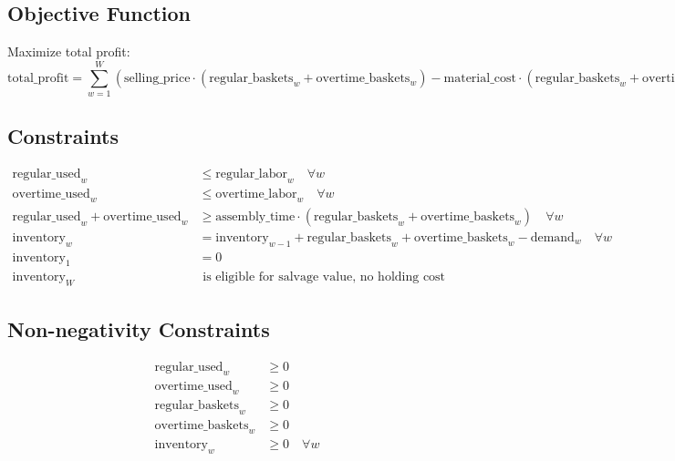 \documentclass{article}
\begin{document}
\subsection*{Objective Function}
Maximize total profit:
\[
\text{total\_profit} = \sum_{w=1}^{W} \left( \text{selling\_price} \cdot (\text{regular\_baskets}_{w} + \text{overtime\_baskets}_{w}) - \text{material\_cost} \cdot (\text{regular\_baskets}_{w} + \text{overtime\_baskets}_{w}) - \text{regular\_cost} \cdot \text{regular\_used}_{w} - \text{overtime\_cost} \cdot \text{overtime\_used}_{w} - \text{holding\_cost} \cdot \text{inventory}_{w} \right)
\]

\subsection*{Constraints}
\begin{align}
\text{regular\_used}_{w} & \leq \text{regular\_labor}_{w} \quad \forall w \\
\text{overtime\_used}_{w} & \leq \text{overtime\_labor}_{w} \quad \forall w \\
\text{regular\_used}_{w} + \text{overtime\_used}_{w} & \geq \text{assembly\_time} \cdot (\text{regular\_baskets}_{w} + \text{overtime\_baskets}_{w}) \quad \forall w \\
\text{inventory}_{w} & = \text{inventory}_{w-1} + \text{regular\_baskets}_{w} + \text{overtime\_baskets}_{w} - \text{demand}_{w} \quad \forall w \\
\text{inventory}_{1} & = 0 \\
\text{inventory}_{W} & \text{ is eligible for salvage value, no holding cost}
\end{align}

\subsection*{Non-negativity Constraints}
\begin{align*}
\text{regular\_used}_{w} & \geq 0 \\
\text{overtime\_used}_{w} & \geq 0 \\
\text{regular\_baskets}_{w} & \geq 0 \\
\text{overtime\_baskets}_{w} & \geq 0 \\
\text{inventory}_{w} & \geq 0 \quad \forall w
\end{align*}
\end{document}
